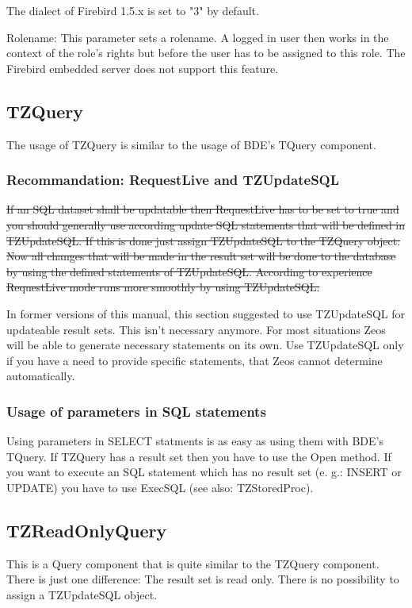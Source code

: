 \documentclass[a4paper,12pt,oneside]{book}
\begin{document}
The dialect of Firebird 1.5.x is set to "3" by default.

Rolename:
This parameter sets a rolename. A logged in user then works in the context of the role's rights but before the user has to be assigned to this role.
The Firebird embedded server does not support this feature.

\subsection{TZQuery}

The usage of TZQuery is similar to the usage of BDE's TQuery component.

\subsubsection{Recommandation: RequestLive and TZUpdateSQL}
\sout{If an SQL dataset shall be updatable then RequestLive has to be set to true and you should generally use according update SQL statements that will be defined in TZUpdateSQL.
If this is done just assign TZUpdateSQL to the TZQuery object.
Now all changes that will be made in the result set will be done to the database by using the defined statements of TZUpdateSQL.
According to experience RequestLive mode runs more smoothly by using TZUpdateSQL.}

In former versions of this manual, this section suggested to use TZUpdateSQL for updateable result sets.
This isn't necessary anymore.
For most situations Zeos will be able to generate necessary statements on its own.
Use TZUpdateSQL only if you have a need to provide specific statements, that Zeos cannot determine automatically.

\subsubsection{Usage of parameters in SQL statements}

Using parameters in SELECT statments is as easy as using them with BDE's TQuery.
If TZQuery has a result set then you have to use the Open method.
If you want to execute an SQL statement which has no result set (e. g.: INSERT or UPDATE) you have to use ExecSQL (see also: TZStoredProc).

\subsection{TZReadOnlyQuery}

This is a Query component that is quite similar to the TZQuery component.
There is just one difference:
The result set is read only.
There is no possibility to assign a TZUpdateSQL object.
\end{document}
